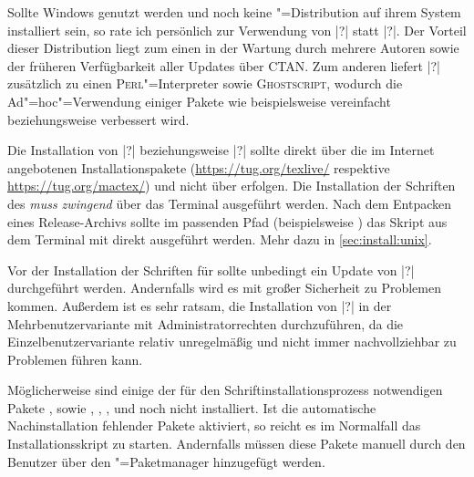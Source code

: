 Sollte Windows genutzt werden und noch keine "=Distribution auf 
ihrem System installiert sein, so rate ich persönlich zur Verwendung von 
|?| statt |?|. 
Der Vorteil dieser Distribution liegt zum einen in der Wartung durch mehrere 
Autoren sowie der früheren Verfügbarkeit aller Updates über CTAN. Zum anderen 
liefert |?| zusätzlich zu  einen 
\textsc{Perl}"=Interpreter sowie \textsc{Ghostscript}, wodurch die 
Ad"=hoc"=Verwendung einiger Pakete wie beispielsweise  
vereinfacht beziehungsweise verbessert wird. 


Die Installation von |?| beziehungsweise 
|?| sollte direkt über die im Internet 
angebotenen Installationspakete (\url{https://tug.org/texlive/} respektive 
\url{https://tug.org/mactex/}) und nicht über  erfolgen. 
%
Die Installation der Schriften des \CDs \emph{muss zwingend} über das Terminal 
ausgeführt werden. Nach dem Entpacken eines Release-Archivs sollte im passenden 
Pfad (beispielsweise ) 
das Skript aus dem Terminal mit  direkt ausgeführt 
werden. Mehr dazu in \autoref{sec:install:unix}.


Vor der Installation der Schriften für \TUDScript sollte unbedingt ein Update 
von |?| durchgeführt werden. Andernfalls wird 
es mit großer Sicherheit zu Problemen kommen. Außerdem ist es sehr ratsam, die 
Installation von |?| in der Mehrbenutzervariante 
mit Administratorrechten durchzuführen, da die Einzelbenutzervariante relativ
unregelmäßig und nicht immer nachvollziehbar zu Problemen führen kann. 

Möglicherweise sind einige der für den Schriftinstallationsprozess notwendigen 
Pakete ,  sowie , 
, ,  und  
noch nicht installiert. Ist die automatische Nachinstallation fehlender Pakete 
aktiviert, so reicht es im Normalfall das Installationsskript zu starten. 
Andernfalls müssen diese Pakete manuell durch den Benutzer über den 
"=Paketmanager hinzugefügt werden.

